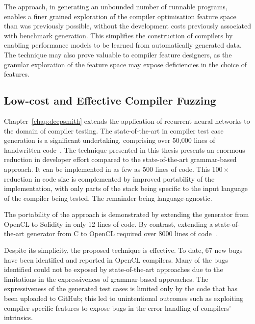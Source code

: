 The approach, in generating an unbounded number of runnable programs, enables a finer grained exploration of the compiler optimisation feature space than was previously possible, without the development costs previously associated with benchmark generation. This simplifies the construction of compilers by enabling performance models to be learned from automatically generated data. The technique may also prove valuable to compiler feature designers, as the granular exploration of the feature space may expose deficiencies in the choice of features.



\subsection{Low-cost and Effective Compiler Fuzzing}

Chapter~\ref{chap:deepsmith} extends the application of recurrent neural networks to the domain of compiler testing. The state-of-the-art in compiler test case generation is a significant undertaking, comprising over 50,000 lines of handwritten code~\cite{Yang2011,Lidbury2015a}. The technique presented in this thesis presents an enormous reduction in developer effort compared to the state-of-the-art grammar-based approach. It can be implemented in as few as 500 lines of code. This $100\times$ reduction in code size is complemented by improved portability of the implementation, with only parts of the stack being specific to the input language of the compiler being tested. The remainder being language-agnostic.

The portability of the approach is demonstrated by extending the generator from OpenCL to Solidity in only 12 lines of code. By contrast, extending a state-of-the-art generator from C to OpenCL required over 8000 lines of code~\cite{Lidbury2015a}.

Despite its simplicity, the proposed technique is effective. To date, 67 new bugs have been identified and reported in OpenCL compilers. Many of the bugs identified could not be exposed by state-of-the-art approaches due to the limitations in the expressiveness of grammar-based approaches. The expressiveness of the generated test cases is limited only by the code that has been uploaded to GitHub; this led to unintentional outcomes such as exploiting compiler-specific features to expose bugs in the error handling of compilers' intrinsics.



